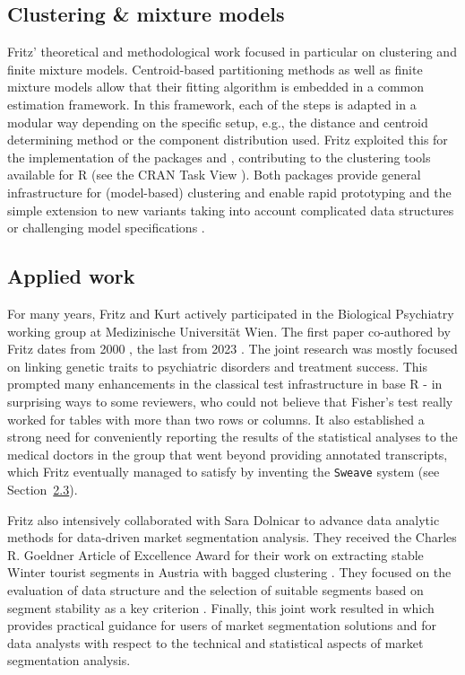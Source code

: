 \subsection{Clustering \& mixture models}\label{clustering-mixture-models}

Fritz' theoretical and methodological work focused in particular on
clustering and finite mixture models. Centroid-based partitioning
methods as well as finite mixture models allow that their fitting
algorithm is embedded in a common estimation framework. In this
framework, each of the steps is adapted in a modular way depending on
the specific setup, e.g., the distance and centroid determining method
or the component distribution used. Fritz exploited this for the
implementation of the packages  \citep{Leisch:2006} and
 \citep{Leisch:2004, Gruen+Leisch:2008}, contributing to
the clustering tools available for R (see the CRAN Task View
). Both packages provide general infrastructure for
(model-based) clustering and enable rapid prototyping and the simple
extension to new variants taking into account complicated data
structures or challenging model specifications \citep[see, for example,
,][]{Frick+Strobl+Leisch:2012}.

\subsection{Applied work}\label{applied-work}

For many years, Fritz and Kurt actively participated in the Biological
Psychiatry working group at Medizinische Universität Wien. The first
paper co-authored by Fritz dates from 2000
\citep{Bailer+Leisch+Meszaros:2000}, the last from 2023
\citep{Solmi+Thompson:2023}. The joint research was mostly
focused on linking genetic traits to psychiatric disorders and
treatment success. This prompted many enhancements in the classical test
infrastructure in base R - in surprising ways to some reviewers, who
could not believe that Fisher's test really worked for tables with more
than two rows or columns. It also established a strong need for
conveniently reporting the results of the statistical analyses to the
medical doctors in the group that went beyond providing annotated
transcripts, which Fritz eventually managed to satisfy by inventing the
\texttt{Sweave} system (see Section~\hyperref[sec:sweave-reproducibility]{2.3}).

Fritz also intensively collaborated with Sara Dolnicar to advance data
analytic methods for data-driven market segmentation analysis. They
received the Charles R. Goeldner Article of Excellence Award for their
work on extracting stable Winter tourist segments in Austria with
bagged clustering \citep{Dolnicar+Leisch:2003}. They focused on the
evaluation of data structure and the selection of suitable segments
based on segment stability as a key criterion \citep{Dolnicar+Leisch:2010, Dolnicar+Leisch:2017}. Finally, this joint work resulted in
\citet{Dolnicar+Gruen+Leisch:2018} which provides practical guidance for
users of market segmentation solutions and for data analysts with
respect to the technical and statistical aspects of market
segmentation analysis.

